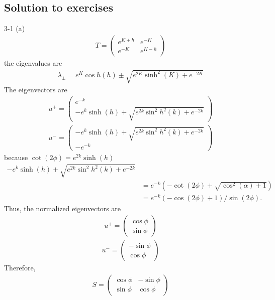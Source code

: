 \documentclass[12pt,titlepage]{article}
\numberwithin{equation}{section}
\begin{document}
\subsection{Solution to exercises}
3-1 (a)
\begin{align*}
T=\left(\begin{array}{ll}{e^{K+h}} & {e^{-K}} \\ {e^{-K}} & {e^{K-h}}\end{array}\right)
\end{align*}
the eigenvalues are 
\begin{align*}
\lambda_{\pm}=e^{K} \cos h(h) \pm \sqrt{e^{2 K} \sinh ^{2}(K)+e^{-2 K}}
\end{align*}
The eigenvectors are
\begin{align*}
u^{+}=\left(\begin{array}{c}{e^{-k}} \\ {-e^{k} \sinh (h)+\sqrt{ e^{2 k} \sin ^{2} h^{2}(k)+e^{-2 k}}}\end{array}\right)
\end{align*}
\begin{align*}
    u^{-}=\left(\begin{array}{c} {-e^{k} \sinh (h)+\sqrt{ e^{2 k} \sin ^{2} h^{2}(k)+e^{-2 k}}}\\-{e^{-k}} \end{array}\right)
\end{align*}
because $\cot(2 \phi)=e^{2 k} \sinh (h)$
\begin{align*}
    -e^{k} \sinh (h)+\sqrt{ e^{2 k} \sin ^{2} h^{2}(k)+e^{-2 k}}\\
    &=e^{-k}\left(-\cot (2 \phi)+\sqrt{\cos ^{2}(\alpha)+1 }\right)\\
    &= e^{-k}(-\cos (2 \phi)+1) / \sin (2 \phi).
\end{align*}
Thus, the normalized eigenvectors are
\begin{align*}
    u^{+}=\left(\begin{array}{c}{\cos \phi} \\ {\sin \phi}\end{array}\right)
\end{align*}
\begin{align*}
    u^{-}=\left(\begin{array}{c}{-\sin \phi} \\ {\cos \phi}\end{array}\right)
\end{align*}
Therefore,
\begin{align*}
    S=\left(\begin{array}{cc}{\cos \phi} & {-\sin \phi} \\ {\sin \phi} & {\cos \phi}\end{array}\right)
\end{align*}
\end{document}
